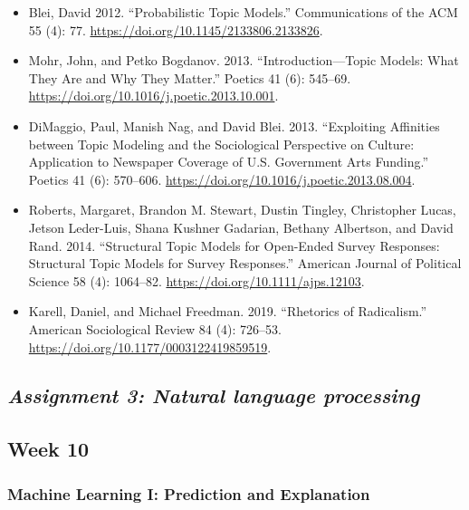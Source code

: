 \documentclass[
  10pt,
]{article}
\providecommand{\tightlist}{%
  \setlength{\itemsep}{0pt}\setlength{\parskip}{0pt}}
\begin{document}
\begin{itemize}
\tightlist
\item
  Blei, David 2012. ``Probabilistic Topic Models.'' Communications of
  the ACM 55 (4): 77. \url{https://doi.org/10.1145/2133806.2133826}.
\item
  Mohr, John, and Petko Bogdanov. 2013. ``Introduction---Topic Models:
  What They Are and Why They Matter.'' Poetics 41 (6): 545--69.
  \url{https://doi.org/10.1016/j.poetic.2013.10.001}.
\item
  DiMaggio, Paul, Manish Nag, and David Blei. 2013. ``Exploiting
  Affinities between Topic Modeling and the Sociological Perspective on
  Culture: Application to Newspaper Coverage of U.S. Government Arts
  Funding.'' Poetics 41 (6): 570--606.
  \url{https://doi.org/10.1016/j.poetic.2013.08.004}.
\item
  Roberts, Margaret, Brandon M. Stewart, Dustin Tingley, Christopher
  Lucas, Jetson Leder-Luis, Shana Kushner Gadarian, Bethany Albertson,
  and David Rand. 2014. ``Structural Topic Models for Open-Ended Survey
  Responses: Structural Topic Models for Survey Responses.'' American
  Journal of Political Science 58 (4): 1064--82.
  \url{https://doi.org/10.1111/ajps.12103}.
\item
  Karell, Daniel, and Michael Freedman. 2019. ``Rhetorics of
  Radicalism.'' American Sociological Review 84 (4): 726--53.
  \url{https://doi.org/10.1177/0003122419859519}.
\end{itemize}

\hypertarget{assignment-3-natural-language-processing}{%
\subsection{\texorpdfstring{\emph{Assignment 3: Natural language
processing}}{Assignment 3: Natural language processing}}\label{assignment-3-natural-language-processing}}

\hypertarget{week-10}{%
\subsection{Week 10}\label{week-10}}

\hypertarget{machine-learning-i-prediction-and-explanation}{%
\subsubsection{Machine Learning I: Prediction and
Explanation}\label{machine-learning-i-prediction-and-explanation}}
\end{document}
